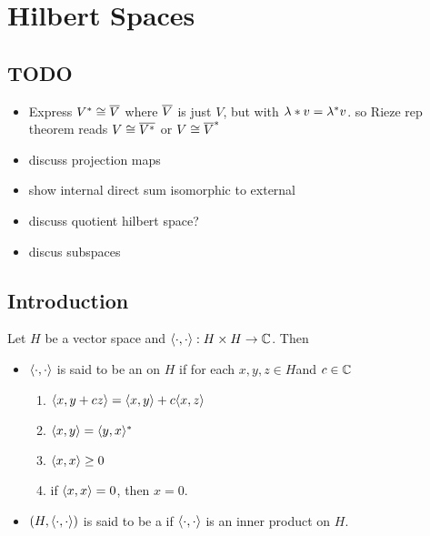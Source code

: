 \documentclass{book}
\begin{document}
	
	
	
	
	
	
	
	
	
	
	
	
	
	
	
	
	\newpage
	\chapter{Hilbert Spaces}
	
	\section{TODO}
	\begin{itemize}
		\item Express $V^* \cong \overline{V}$ where $\overline{V}$ is just $V$, but with $\lambda * v  = \lambda^* v$. so Rieze rep theorem reads $V \cong \overline{V^*}$ or $V \cong \overline{V}^*$
		\item discuss projection maps
		\item show internal direct sum isomorphic to external
		\item discuss quotient hilbert space?
		\item discus subspaces
	\end{itemize}
	
	
	
	
	
	
	
	
	
	
	
	
	
	
	
	\section{Introduction}
	
	\begin{defn} \ld{}
		Let $H$ be a vector space and $\langle \cdot, \cdot \rangle: H \times H \rightarrow \mathbb{C}$. Then 
		\begin{itemize}
			\item $\langle \cdot, \cdot \rangle$ is said to be an  on $H$ if for each $x,y,z \in H$and $c \in \mathbb{C}$
			\begin{enumerate}
				\item $\langle x , y + cz\rangle = \langle x , y \rangle + c\langle x , z\rangle $
				\item $\langle x , y \rangle = \langle y , x\rangle^*$
				\item $\langle x , x \rangle \geq 0$
				\item if $\langle x ,x \rangle = 0$, then $x = 0$.  
			\end{enumerate}
			\item $(H, \langle \cdot, \cdot \rangle)$ is said to be a  if $\langle \cdot, \cdot \rangle$ is an inner product on $H$.
		\end{itemize}
	\end{defn}
\end{document}
